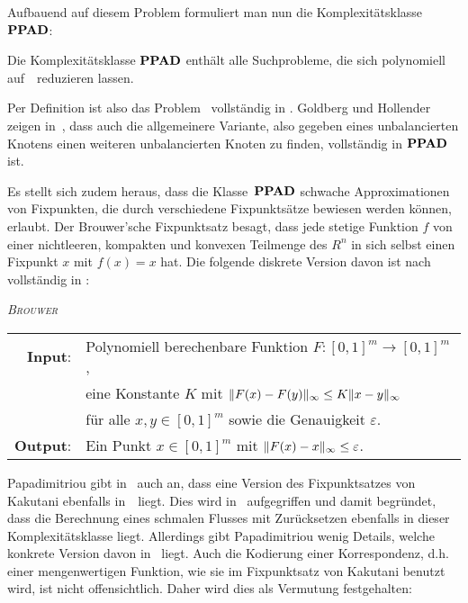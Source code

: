 Aufbauend auf diesem Problem formuliert man nun die Komplexitätsklasse~$\textbf{PPAD}$:

\begin{definition}
	Die Komplexitätsklasse $\textbf{PPAD}$ enthält alle Suchprobleme, die sich polynomiell auf~\EndOfTheLine\ reduzieren lassen.
\end{definition}

Per Definition ist also das Problem \EndOfTheLine~vollständig in \PPAD.
Goldberg und Hollender zeigen in~\cite[Theorem 15]{hairyball}, dass auch die allgemeinere Variante, also gegeben eines unbalancierten Knotens einen weiteren unbalancierten Knoten zu finden, vollständig in $\textbf{PPAD}$ ist.

Es stellt sich zudem heraus, dass die Klasse~$\textbf{PPAD}$ schwache Approximationen von Fixpunkten, die durch verschiedene Fixpunktsätze bewiesen werden können, erlaubt.
Der Brouwer'sche Fixpunktsatz besagt, dass jede stetige Funktion $f$ von einer nichtleeren, kompakten und konvexen Teilmenge des $R^n$ in sich selbst einen Fixpunkt $x$ mit $f(x) = x$ hat.
Die folgende diskrete Version davon ist nach~\cite{DASKALAKIS2019} vollständig in \PPAD:

\newcommand{\Brouwer}{\textsc{Brouwer}}
\begin{center}
	\begin{mdframed}
		\centering
		\emph{\Brouwer} \\[1em]
		\begin{tabular}{rl}
			{\bfseries Input}: &Polynomiell berechenbare Funktion $F: [0,1]^m \rightarrow [0, 1]^m$,\\
			& eine Konstante $K$ mit $\lVert F(x) - F(y)\rVert_\infty \leq K \lVert x - y\rVert_\infty$\\
			&für alle $x,y\in[0,1]^m$ sowie die Genauigkeit $\varepsilon$.\\
			{\bfseries Output}: & Ein Punkt $x\in[0,1]^m$ mit $\lVert F(x) - x\rVert_\infty \leq \varepsilon$.
		\end{tabular}
	\end{mdframed}
\end{center}

Papadimitriou gibt in~\cite{PPAD1994} auch an, dass eine Version des Fixpunktsatzes von Kakutani ebenfalls in~\PPAD\ liegt.
Dies wird in~\cite{Cominetti2015} aufgegriffen und damit begründet, dass die Berechnung eines schmalen Flusses mit Zurücksetzen ebenfalls in dieser Komplexitätsklasse liegt.
Allerdings gibt Papadimitriou wenig Details, welche konkrete Version davon in \PPAD\ liegt.
Auch die Kodierung einer Korrespondenz, d.h. einer mengenwertigen Funktion, wie sie im Fixpunktsatz von Kakutani benutzt wird, ist nicht offensichtlich.
Daher wird dies als Vermutung festgehalten:

